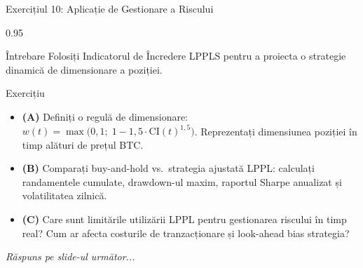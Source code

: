 \documentclass[9pt, aspectratio=169, t]{beamer}
\begin{document}
\begin{frame}{Exercițiul 10: Aplicație de Gestionare a Riscului}
    \begin{cminipage}{0.95\textwidth}
    \begin{alertblock}{Întrebare}
        Folosiți Indicatorul de Încredere LPPLS pentru a proiecta o strategie dinamică de dimensionare a poziției.
    \end{alertblock}

    \vspace{0.15cm}

    \begin{block}{Exercițiu}
        \begin{itemize}\setlength{\itemsep}{3pt}
            \item \textcolor{MainBlue}{\textbf{(A)}} Definiți o regulă de dimensionare: $w(t) = \max\bigl(0{,}1;\; 1 - 1{,}5 \cdot \text{CI}(t)^{1{,}5}\bigr)$. Reprezentați dimensiunea poziției în timp alături de prețul BTC.
            \item \textcolor{MainBlue}{\textbf{(B)}} Comparați buy-and-hold vs.\ strategia ajustată LPPL: calculați randamentele cumulate, drawdown-ul maxim, raportul Sharpe anualizat și volatilitatea zilnică.
            \item \textcolor{MainBlue}{\textbf{(C)}} Care sunt limitările utilizării LPPL pentru gestionarea riscului în timp real? Cum ar afecta costurile de tranzacționare și look-ahead bias strategia?
        \end{itemize}
    \end{block}

    \vspace{0.1cm}

    \begin{center}
        \textit{Răspuns pe slide-ul următor...}
    \end{center}
    \end{cminipage}
\end{frame}
\end{document}
